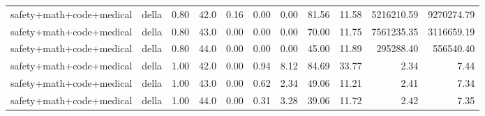 \documentclass{article}
\begin{document}
\begin{table}[H]
{\begin{tabular}{llllrrrrrrr}
safety+math+code+medical & della & 0.80 & 42.0 & 0.16 & 0.00 & 0.00 & 81.56 & 11.58 & 5216210.59 & 9270274.79 \\
safety+math+code+medical & della & 0.80 & 43.0 & 0.00 & 0.00 & 0.00 & 70.00 & 11.75 & 7561235.35 & 3116659.19 \\
safety+math+code+medical & della & 0.80 & 44.0 & 0.00 & 0.00 & 0.00 & 45.00 & 11.89 & 295288.40 & 556540.40 \\
safety+math+code+medical & della & 1.00 & 42.0 & 0.00 & 0.94 & 8.12 & 84.69 & 33.77 & 2.34 & 7.44 \\
safety+math+code+medical & della & 1.00 & 43.0 & 0.00 & 0.62 & 2.34 & 49.06 & 11.21 & 2.41 & 7.34 \\
safety+math+code+medical & della & 1.00 & 44.0 & 0.00 & 0.31 & 3.28 & 39.06 & 11.72 & 2.42 & 7.35 \\
\bottomrule
\end{tabular}
}
\end{table}
\end{document}
